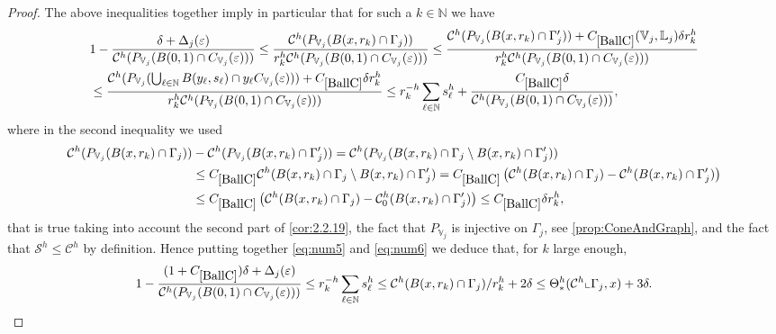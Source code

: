 \documentclass[10pt, a4paper,
oneside, headinclude,footinclude]{scrartcl}
\begin{document}
\begin{proof}
The above inequalities together imply in particular that for such a $k\in\mathbb N$ we have
\begin{equation}
\begin{split}
      &1-\frac{\delta+\Delta_j(\varepsilon)}{\mathcal{C}^h(P_{\mathbb V_j}(B(0,1)\cap C_{\mathbb V_j}(\varepsilon)))}\leq \frac{\mathcal{C}^h(P_{\mathbb V_j}(B(x,r_k)\cap \Gamma_j))}{r_k^h\mathcal{C}^h(P_{\mathbb V_j}(B(0,1)\cap C_{\mathbb V_j}(\varepsilon)))}\leq\frac{\mathcal{C}^h(P_{\mathbb V_j}(B(x,r_k)\cap \Gamma_j^\prime))+\oldC{BallC}(\mathbb V_j,\mathbb L_j)\delta r_k^h}{r_k^h\mathcal{C}^h(P_{\mathbb V_j}(B(0,1)\cap C_{\mathbb V_j}(\varepsilon)))}\\
     &\leq\frac{\mathcal{C}^h(P_{\mathbb V_j}(\bigcup_{\ell\in\N}B(y_\ell,s_\ell)\cap y_\ell C_{\mathbb{V}_j}(\varepsilon)))+\oldC{BallC}\delta r_k^h}{r_k^h\mathcal{C}^h(P_{\mathbb V_j}(B(0,1)\cap C_{\mathbb V_j}(\varepsilon)))}
      \leq r_k^{-h}\sum_{    \ell\in\N} s_\ell^h+\frac{\oldC{BallC}\delta}{\mathcal{C}^h(P_{\mathbb V_j}(B(0,1)\cap C_{\mathbb V_j}(\varepsilon)))},\end{split}
  \label{eq:num6}
\end{equation}
where in the second inequality we used 
\begin{equation}
\begin{split}
\mathcal{C}^h(P_{\mathbb V_j}(B(x,r_k)\cap \Gamma_j))&-\mathcal{C}^h(P_{\mathbb V_j}(B(x,r_k)\cap \Gamma_j'))=\mathcal{C}^h(P_{\mathbb V_j}(B(x,r_k)\cap \Gamma_j\setminus B(x,r_k)\cap \Gamma_j'))\\
&\leq \oldC{BallC}\mathcal{C}^h(B(x,r_k)\cap \Gamma_j\setminus B(x,r_k)\cap \Gamma_j')=\oldC{BallC}\left(\mathcal{C}^h(B(x,r_k)\cap \Gamma_j)-\mathcal{C}^h(B(x,r_k)\cap \Gamma_j')\right) \\
&\leq \oldC{BallC}\left(\mathcal{C}^h(B(x,r_k)\cap \Gamma_j)-\mathcal{C}^h_0(B(x,r_k)\cap \Gamma_j')\right)\leq \oldC{BallC}\delta r_k^h,
\end{split}
\end{equation}
that is true taking into account the second part of \cref{cor:2.2.19}, the fact that $P_{\mathbb V_j}$ is injective on $\Gamma_j$, see \cref{prop:ConeAndGraph}, and the fact that $\mathcal{S}^h\leq \mathcal{C}^h$ by definition.
Hence putting together \eqref{eq:num5} and \eqref{eq:num6} we deduce that, for $k$ large enough,
$$
1-\frac{(1+\oldC{BallC})\delta+\Delta_j(\varepsilon)}{\mathcal{C}^h(P_{\mathbb V_j}(B(0,1)\cap C_{\mathbb V_j}(\varepsilon)))}\leq r_k^{-h}\sum_{\ell\in\N}s_\ell^h\leq\mathcal{C}^h(B(x,r_k)\cap \Gamma_j)/r_k^h+2\delta\leq\Theta^h_*(\mathcal{C}^h\llcorner \Gamma_j,x)+3\delta.
$$
\end{proof}
\end{document}

